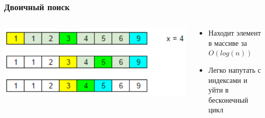 \documentclass[xetex,mathserif,serif]{beamer}
\begin{document}
	\begin{frame}
		\frametitle{Двоичный поиск}
		\begin{columns}
			\begin{column}{0.5\textwidth}
				\includegraphics[width=\textwidth]{binSearch.png}
			\end{column}
			\begin{column}{0.5\textwidth}
				\begin{itemize}
					\item Находит элемент в массиве за $O(log(n))$
					\item Легко напутать с индексами и уйти в бесконечный цикл
				\end{itemize}
			\end{column}
		\end{columns}
	\end{frame}
\end{document}
